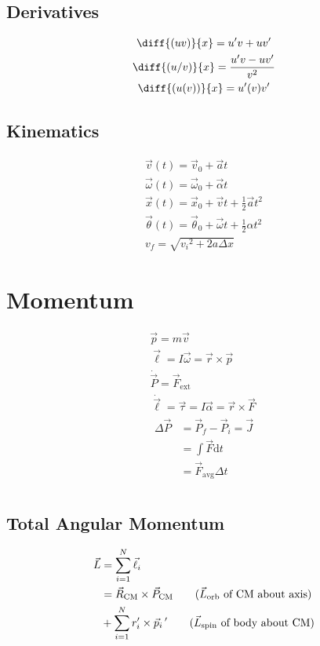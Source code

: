\documentclass[tbtags]{cheatsheet}
\begin{document}
	\subsection{Derivatives}
		\begin{gather*}
			\diff{(uv)}{x} = u'v + uv'	\\
			\diff{(u/v)}{x} = \frac{u'v - uv'}{v^2}	\\
			\diff{( u(v) )}{x} = u'(v)v'
		\end{gather*}
	\subsection{Kinematics}
		\begin{gather*}
			\vec v(t) = \vec v_0 + \vec at 	\tag{velocity}\\
			\vec \omega(t) = \vec\omega_0 + \vec\alpha t	\tag{rot. form}\\
			\vec x(t) = \vec x_0 + \vec vt + \frac{1}{2}\vec a t^2	\tag{displacement}\\
			\vec\theta(t) = \vec\theta_0 + \vec\omega t + \frac{1}{2}\alpha t^2	\tag{rot. form}\\
			v_f = \sqrt{{v_i}^2 + 2a\Delta x}	\tag{$v_f$}
		\end{gather*}

	\section{Momentum}
	\begin{gather*}
		\vec p = m\vec v	\tag{momentum}\\
		\vec\ell = I\vec\omega = \vec r \times \vec p	\tag{rot. form}\\
		\dot{\vec P} = \vec F_\mathrm{ext} \tag{3rd law}\\
		\dot{\vec\ell} = \vec\tau = I\vec\alpha= \vec r \times \vec F	\tag{rot. form}\\
		\begin{split}
				\Delta\vec P &= \vec P_f - \vec P_i = \vec J	\\
			&= \int \vec F \mathrm{d}t	\\
			&= \vec F_\text{avg}\Delta t
		\end{split}\tag{impulse}\\
	\end{gather*}
		\subsection{Total Angular Momentum}
		\begin{align*}
			\vec L &= \sum_{i=1}^{N} \vec\ell_i	\\
			&= \vec R_\text{CM} \times \vec P_\text{CM}	\tag{$\vec L_\text{orb}$ of CM about axis}\\
			&+ \sum_{i=1}^{N} r_i' \times \vec p_i\,'		\tag{$\vec L_\text{spin}$ of body about CM}
		\end{align*}
\end{document}
